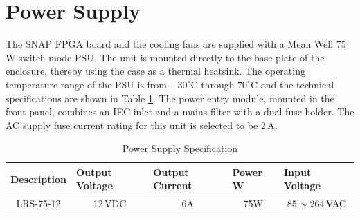 \documentclass[12pt,a4paper,oneside]{article}
\begin{document}
\section{Power Supply}
\label{sec:5}

The SNAP FPGA board and the cooling fans are supplied with a Mean Well 75\,W switch-mode PSU.
The unit is mounted directly to the base plate of the enclosure, thereby using the case as a thermal heatsink.
The operating temperature range of the PSU is from $-30^{\circ}$C through $70^{\circ}$C and the technical specifications are shown in Table \ref{tab:psu_spec}.
The power entry module, mounted in the front panel, combines an IEC inlet and a mains filter with a dual-fuse holder. The AC supply fuse current rating for this unit is selected to be 2\,A. 



\begin{table}[H]
\centering
\caption{Power Supply Specification}
\label{tab:psu_spec}
\begin{tabular}{@{}ccccc@{}}
\toprule
\multicolumn{1}{l}{Description} & \multicolumn{1}{l}{Output Voltage} & \multicolumn{1}{l}{Output Current} & \multicolumn{1}{l}{Power W} & \multicolumn{1}{l}{Input Voltage} \\ \midrule
LRS-75-12                         & 12\,VDC                               & 6A                               & 75W                         & $85 \sim 264\,\rm{VAC}$                              \\ \bottomrule
\end{tabular}
\end{table}



\end{document}
